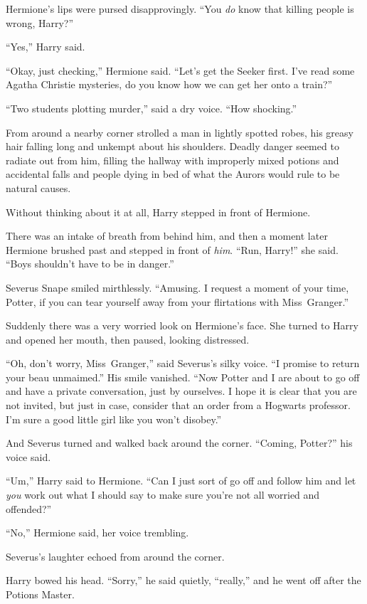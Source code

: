 Hermione’s lips were pursed disapprovingly. “You \emph{do} know that killing people is wrong, Harry?”

“Yes,” Harry said.

“Okay, just checking,” Hermione said. “Let’s get the Seeker first. I’ve read some Agatha Christie mysteries, do you know how we can get her onto a train?”

“Two students plotting murder,” said a dry voice. “How shocking.”

From around a nearby corner strolled a man in lightly spotted robes, his greasy hair falling long and unkempt about his shoulders. Deadly danger seemed to radiate out from him, filling the hallway with improperly mixed potions and accidental falls and people dying in bed of what the Aurors would rule to be natural causes.

Without thinking about it at all, Harry stepped in front of Hermione.

There was an intake of breath from behind him, and then a moment later Hermione brushed past and stepped in front of \emph{him}. “Run, Harry!” she said. “Boys shouldn’t have to be in danger.”

Severus Snape smiled mirthlessly. “Amusing. I request a moment of your time, Potter, if you can tear yourself away from your flirtations with Miss~Granger.”

Suddenly there was a very worried look on Hermione’s face. She turned to Harry and opened her mouth, then paused, looking distressed.

“Oh, don’t worry, Miss~Granger,” said Severus’s silky voice. “I promise to return your beau unmaimed.” His smile vanished. “Now Potter and I are about to go off and have a private conversation, just by ourselves. I hope it is clear that you are not invited, but just in case, consider that an order from a Hogwarts professor. I’m sure a good little girl like you won’t disobey.”

And Severus turned and walked back around the corner. “Coming, Potter?” his voice said.

“Um,” Harry said to Hermione. “Can I just sort of go off and follow him and let \emph{you} work out what I should say to make sure you’re not all worried and offended?”

“No,” Hermione said, her voice trembling.

Severus’s laughter echoed from around the corner.

Harry bowed his head. “Sorry,” he said quietly, “really,” and he went off after the Potions Master.

